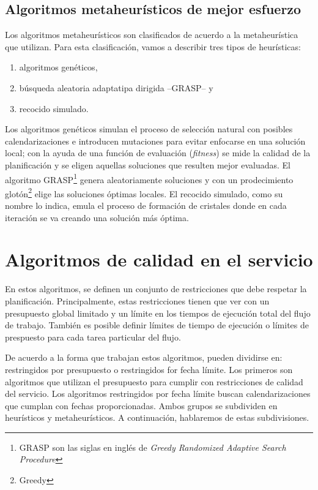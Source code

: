 \subsection{Algoritmos metaheurísticos de mejor esfuerzo}

Los algoritmos metaheurísticos son clasificados de acuerdo a la metaheurística que utilizan. Para esta clasificación, vamos a describir tres tipos de heurísticas: 

\begin{enumerate}
\item{algoritmos genéticos,}
\item{búsqueda aleatoria adaptatipa dirigida --GRASP-- y}
\item{recocido simulado.}
\end{enumerate}

Los algoritmos genéticos simulan el proceso de selección natural con posibles calendarizaciones e introducen mutaciones para evitar enfocarse en una solución local; con la ayuda de una función de evaluación (\emph{fitness}) se mide la calidad de la planificación y se eligen aquellas soluciones que resulten mejor evaluadas. El algoritmo GRASP\footnote{GRASP son las siglas en inglés de \emph{Greedy Randomized Adaptive Search Procedure}} genera aleatoriamente soluciones y con un prodecimiento glotón\footnote{Greedy} elige las soluciones óptimas locales. El recocido simulado, como su nombre lo indica, emula el proceso de formación de cristales donde en cada iteración se va creando una solución más óptima.

\section{Algoritmos de calidad en el servicio}
En estos algoritmos, se definen un conjunto de restricciones que debe respetar la planificación. Principalmente, estas restricciones tienen que ver con un presupuesto global limitado y un límite en los tiempos de ejecución total del flujo de trabajo. También es posible definir límites de tiempo de ejecución o límites de prespuesto para cada tarea particular del flujo.

De acuerdo a la forma que trabajan estos algoritmos, pueden dividirse en: restringidos por presupuesto o restringidos for fecha límite. Los primeros son algoritmos que utilizan el presupuesto para cumplir con restricciones de calidad del servicio. Los algoritmos restringidos por fecha límite buscan calendarizaciones que cumplan con fechas proporcionadas. Ambos grupos se subdividen en heurísticos y metaheurísticos. A continuación, hablaremos de estas subdivisiones.


